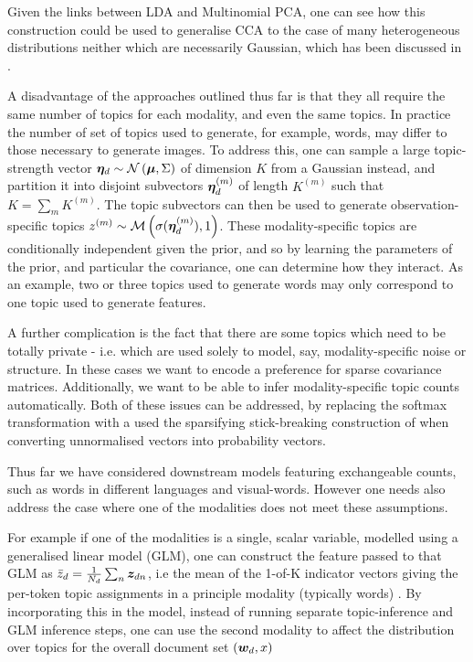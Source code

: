 Given the links between LDA and Multinomial PCA\cite{Buntine2002}, one can see how this construction could be used to generalise CCA to the case of many heterogeneous distributions neither which are necessarily Gaussian, which has been discussed in \cite{Virtanen2012a}. 

A disadvantage of the approaches outlined thus far is that they all require the same number of topics for each modality, and even the same topics. In practice the number of set of topics used to generate, for example, words, may differ to those necessary to generate images. To address this, one can sample a large topic-strength vector $\bm \eta_d \sim \mathcal{N} \left( {\bm \mu}, {\Sigma} \right)$ of dimension $K$ from a Gaussian instead, and partition it into disjoint subvectors $\bm \eta_d^{(m)}$ of length $K^{(m)}$ such that $K = \sum_m K^{(m)}$. The topic subvectors can then be used to generate observation-specific topics $z^{(m)} \sim \mathcal{M} \left( {\sigma(\bm \eta_d^{(m)})},{1} \right)$. These modality-specific topics are conditionally independent given the prior, and so by learning the parameters of the prior, and particular the covariance, one can determine how they interact\cite{Salomatin2009}. As an example, two or three topics used to generate words may only correspond to one topic used to generate features.

A further complication is the fact that there are some topics which need to be totally private - i.e. which are used solely to model, say, modality-specific noise or structure. In these cases we want to encode a preference for sparse covariance matrices. Additionally, we want to be able to infer modality-specific topic counts automatically. Both of these issues can be addressed, by replacing the softmax transformation with a used the sparsifying stick-breaking construction of \cite{Paisley2012} when converting unnormalised vectors into probability vectors\cite{Virtanen2012a}.

Thus far we have considered downstream models featuring exchangeable counts, such as words in different languages and visual-words. However one needs also address the case where one of the modalities does not meet these assumptions.

For example if one of the modalities is a single, scalar variable, modelled using a generalised linear model (GLM), one can construct the feature passed to that GLM as $\bar{z}_d = \frac{1}{N_d} \sum_n \bm z_{dn}$, i.e the mean of the 1-of-K indicator vectors giving the per-token topic assignments in a principle modality (typically words) \cite{Blei2008}. By incorporating this in the model, instead of running separate topic-inference and GLM inference steps, one can use the second modality to affect the distribution over topics for the overall document set $({ \bm w_d }, x)$

